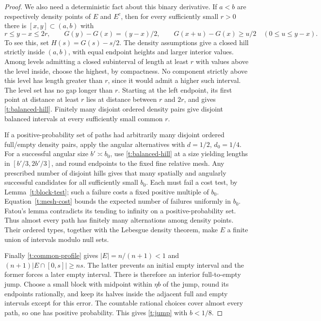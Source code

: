 \begin{proof}
We also need a deterministic fact about this binary derivative.  If
$a<b$ are respectively density points of $E$ and $E^c$, then for every
sufficiently small $r>0$ there is $[x,y]\subset(a,b)$ with
\begin{equation}\label{t:balanced-hill}
 r\le y-x\le2r,\qquad
 G(y)-G(x)=(y-x)/2,\qquad
 G(x+u)-G(x)\ge u/2\quad(0\le u\le y-x).
\end{equation}
To see this, set $H(s)=G(s)-s/2$.  The density assumptions give a
closed hill strictly inside $(a,b)$, with equal endpoint heights and
larger interior values.  Among levels admitting a closed subinterval
of length at least $r$ with values above the level inside, choose the
highest, by compactness.  No component strictly above this level has
length greater than $r$, since it would admit a higher such interval.
The level set has no gap longer than $r$.  Starting at the left
endpoint, its first point at distance at least $r$ lies at distance
between $r$ and $2r$, and gives \eqref{t:balanced-hill}.  Finitely many
disjoint ordered density pairs give disjoint balanced intervals at
every sufficiently small common $r$.

If a positive-probability set of paths had arbitrarily many disjoint
ordered full/empty density pairs, apply the angular alternatives with
$d=1/2$, $d_0=1/4$.  For a successful angular size $b'\asymp b_0$, use
\eqref{t:balanced-hill} at a size yielding lengths in $[b'/3,2b'/3]$,
and round endpoints to the fixed fine relative mesh.  Any prescribed
number of disjoint hills gives that many spatially and angularly
successful candidates for all sufficiently small $b_0$.  Each must
fail a cost test, by Lemma~\ref{t:block-test}; such a failure costs a
fixed positive multiple of $b_0$.  Equation~\eqref{t:mesh-cost} bounds
the expected number of failures uniformly in $b_0$.  Fatou's lemma
contradicts its tending to infinity on a positive-probability set.
Thus almost every path has finitely many alternations among density
points.  Their ordered types, together with the Lebesgue density
theorem, make $E$ a finite union of intervals modulo null sets.

Finally \eqref{t:common-profile} gives
$|E|=n/(n+1)<1$ and $(n+1)|E\cap[0,s]|\ge ns$.  The latter prevents
an initial empty interval and the former forces a later empty interval.
There is therefore an interior full-to-empty jump.  Choose a small
block with midpoint within $\eta b$ of the jump, round its endpoints
rationally, and keep its halves inside the adjacent full and empty
intervals except for this error.  The countable rational choices cover
almost every path, so one has positive probability.  This gives
\eqref{t:jump} with $b<1/8$.
\end{proof}

